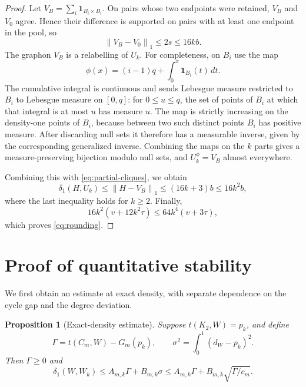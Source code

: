 \documentclass[11pt]{article}
\newtheorem{proposition}[lemma]{Proposition}
\theoremstyle{remark}
\newcommand{\ind}{\mathbf{1}}
\newcommand{\norm}[1]{\left\lVert #1\right\rVert}
\begin{document}
\begin{proof}
Let $V_B=\sum_i\ind_{B_i\times B_i}$.
On pairs whose two endpoints were retained, $V_B$ and $V_0$ agree.
Hence their difference is supported on pairs with at least one
endpoint in the pool, so
\[
 \norm{V_B-V_0}_1\leq2s\leq16kb.
\]
The graphon $V_B$ is a relabelling of $U_k$.
For completeness, on $B_i$ use the map
\[
 \phi(x)=(i-1)q+\int_0^x\ind_{B_i}(t)\,dt.
\]
The cumulative integral is continuous and sends Lebesgue measure
restricted to $B_i$ to Lebesgue measure on $[0,q]$:
for $0\leq u\leq q$, the set of points of $B_i$ at which that
integral is at most $u$ has measure $u$.
The map is strictly increasing on the density-one points of $B_i$,
because between two such distinct points $B_i$ has positive measure.
After discarding null sets it therefore has a measurable inverse,
given by the corresponding generalized inverse. Combining the maps
on the $k$ parts gives a measure-preserving bijection modulo null
sets, and $U_k^\phi=V_B$ almost everywhere.

Combining this with \eqref{eq:partial-cliques}, we obtain
\[
 \delta_1(H,U_k)\leq\norm{H-V_B}_1
 \leq(16k+3)b\leq16k^2b,
\]
where the last inequality holds for $k\geq2$.
Finally,
\[
 16k^2(v+12k^2\tau)\leq64k^4(v+3\tau),
\]
which proves \eqref{eq:rounding}.
\end{proof}

\section{Proof of quantitative stability}\label{sec:completion}

We first obtain an estimate at exact density, with separate dependence
on the cycle gap and the degree deviation.

\begin{proposition}[Exact-density estimate]\label{prop:exact}
Suppose $t(K_2,W)=p_k$, and define
\[
 \Gamma=t(C_m,W)-G_m(p_k),\qquad
 \sigma^2=\int_0^1(d_W-p_k)^2.
\]
Then $\Gamma\geq0$ and
\begin{equation}\label{eq:exact-estimate}
 \delta_1(W,W_k)
 \leq A_{m,k}\Gamma+B_{m,k}\sigma
 \leq A_{m,k}\Gamma+B_{m,k}\sqrt{\Gamma/c_m}.
\end{equation}
\end{proposition}
\end{document}

